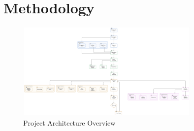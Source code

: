 \section{Methodology}

\begin{figure}
    \centering
    \includegraphics[width=0.8\textwidth]{../images/architecture.png} %
    \caption{Project Architecture Overview}
    \label{fig:project_architecture}
\end{figure}

